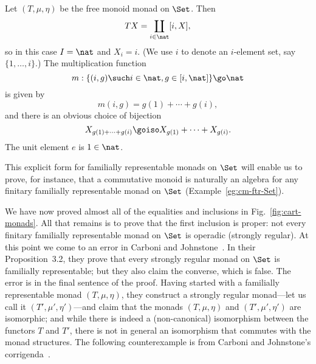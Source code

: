 \begin{example}
Let $(T, \mu, \eta)$ be the free monoid monad on $\Set$.  Then
\[
TX = \coprod_{i\in\nat} [i,X],
\]
so in this case $I=\nat$ and $X_i = i$.  (We use $i$ to denote an
$i$-element set, say $\{1, \ldots, i\}$.)  The multiplication function
\[
m: \{ (i, g) \such i \in \nat, g\in [i, \nat] \}  \go  \nat
\]
is given by
\[
m(i, g) = g(1) + \cdots + g(i),
\]
and there is an obvious choice of bijection
\[
X_{g(1) + \cdots + g(i)} \goiso X_{g(1)} + \cdots + X_{g(i)}.
\]
The unit element $e$ is $1\in\nat$.
\end{example}

This explicit form for familially representable monads on $\Set$ will
enable us to prove, for instance, that a commutative monoid is naturally an
algebra for any finitary familially representable monad on $\Set$
(Example~\ref{eg:cm-ftr-Set}).

We have now proved almost all of the equalities and inclusions in
Fig.~\ref{fig:cart-monads}.  All that remains is to prove that the first
inclusion is proper: not every finitary familially representable monad on
$\Set$ is operadic (strongly%
%
%
%
%
regular).  At this point we come to an error in Carboni and
Johnstone~\cite{CJ}.  In their Proposition~3.2, they prove that every
strongly regular monad on $\Set$ is familially representable; but they also
claim the converse, which is false.%
%
%
The error is in the final sentence of the proof.  Having started with a
familially representable monad $(T, \mu, \eta)$, they construct a strongly
regular monad---let us call it $(T',\mu',\eta')$---and claim that the
monads $(T, \mu, \eta)$ and $(T', \mu', \eta')$ are isomorphic; and while
there is indeed a (non-canonical) isomorphism between the functors $T$ and
$T'$, there is not in general an isomorphism that commutes with the monad
structures.  The following counterexample is from Carboni and Johnstone's
corrigenda~\cite{CJcorr}.

